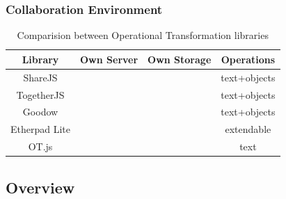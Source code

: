 \documentclass[compress]{beamer}
\newcommand{\cmark}{{\color{mygreen}\ding{51}}}%
\newcommand{\xmark}{{\color{red}\ding{55}}}%
\begin{document}
  		\begin{frame}[c]
		\frametitle{Collaboration Environment}

			\begin{table}
			\centering
			\caption{Comparision between Operational Transformation libraries}
			\label{table:otcomparision}
			\begin{tabular}{|c|c|c|c|}
			\hline
			\textbf{Library} & \textbf{Own Server} & \textbf{Own Storage} & \textbf{Operations} \\ \hline
			ShareJS          & \cmark                 & \cmark                  & text+objects        \\ \hline
			TogetherJS       & \cmark                 & \xmark                   & text+objects        \\ \hline
			Goodow           & \cmark                 & \cmark                  & text+objects        \\ \hline
			Etherpad Lite    & \cmark                 & \cmark                  & extendable 			    \\ \hline
			OT.js            & \xmark                  & \xmark                   & text                \\ \hline
			\end{tabular}
			\end{table}

		\end{frame}

	\subsection{Overview}
\end{document}
